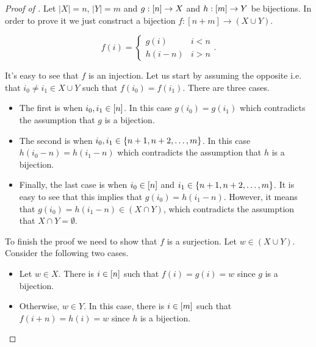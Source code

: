 \begin{proof}[Proof of ]
  Let $|X| = n$, $|Y| = m$ and $g : {[{n}]} \to X$ and $h : {[{m}]} \to Y$ be
  bijections. In order to prove it we just construct a bijection
  $f : [n + m] \to (X \cup Y)$.

  \[
    f(i) =
    \begin{cases}
        g(i) & i < n \\
        h(i  - n) & i > n
    \end{cases}.
  \]

  It's easy to see that $f$ is an injection. Let us start by assuming the opposite i.e.
  that $i_0 \neq i_1 \in X \cup Y$ such that $f(i_0) = f(i_1)$.
  There are three cases.
  \begin{itemize}
    \item The first is when $i_0, i_1 \in {[{n}]}$. In this case $g(i_0) = g(i_1)$
      which contradicts the assumption that $g$ is a bijection.
    \item The second is when $i_0, i_1 \in \set{n + 1, n + 2, \dots, m}$.
      In this case $h(i_0 - n) = h(i_1 - n)$ which contradicts the assumption
      that $h$ is a bijection.
    \item Finally, the last case is when $i_0 \in {[{n}]}$ and
      $i_1 \in \set{n + 1, n + 2, \dots, m}$. It is easy to see that this
      implies that $g(i_0) = h(i_1 - n)$. However, it
      means that $g(i_0) = h(i_1 - n) \in (X \cap Y)$, which contradicts the
      assumption that $X \cap Y = \emptyset$.
  \end{itemize}

  To finish the proof we need to show that $f$ is a surjection. Let
  $w \in (X \cup Y)$. Consider the following two cases.
  \begin{itemize}
    \item Let $w \in X$. There is $i \in {[{n}]}$ such that $f(i) = g(i) = w$ since
      $g$ is a bijection.
    \item Otherwise, $w \in Y$. In this case, there is $i \in {[{m}]}$ such that
      $f(i + n) = h(i) = w$ since $h$ is a bijection.
  \end{itemize}
\end{proof}

